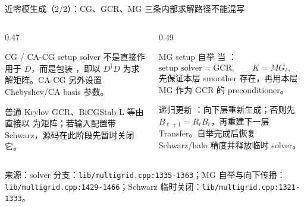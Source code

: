 \documentclass[UTF8,aspectratio=169,11pt]{ctexbeamer}
\newcommand{\source}[1]{\vspace{0.05em}\par{\raggedright\scriptsize\color{muted}来源：#1\par}}
\newcommand{\codepath}[1]{\nolinkurl{#1}}
\begin{document}
\begin{frame}[t]{近零模生成（2/2）：CG、GCR、MG 三条内部求解路径不能混写}
  \begin{columns}[T,totalwidth=\textwidth]
    \begin{column}{0.47\textwidth}
      \begin{block}{CG / CA-CG}
        setup solver 不是直接作用于 \(D\)，而是包装 \texttt{}，即以 \(D^\dagger D\) 为求解矩阵。CA-CG 另外设置 Chebyshev/CA basis 参数。
      \end{block}
      \begin{block}{普通 Krylov}
        GCR、BiCGStab-L 等由 \texttt{} 直接以 \texttt{} 为矩阵；若输入配置带 Schwarz，源码在此阶段先暂时关闭它。
      \end{block}
    \end{column}
    \begin{column}{0.49\textwidth}
      \begin{block}{MG setup 自举}
        当 \texttt{}：
        \[
          \text{setup solver}=\text{GCR},
          \qquad K=MG_\ell,
          \qquad \text{每轮最多一次 MG 预条件调用}.
        \]
        先保证本层 smoother 存在，再用本层 MG 作为 GCR 的 preconditioner。
      \end{block}
      \begin{alertblock}{递归更新}
        \texttt{}：向下层重新生成；否则先 \(B_{\ell+1}=R_\ell B_\ell\)，再重建下一层 Transfer。自举完成后恢复 Schwarz/halo 精度并释放临时 solver。
      \end{alertblock}
    \end{column}
  \end{columns}
  \source{solver 分支：\codepath{lib/multigrid.cpp:1335-1363}；MG 自举与向下传播：\codepath{lib/multigrid.cpp:1429-1466}；Schwarz 临时关闭：\codepath{lib/multigrid.cpp:1321-1333}。}
\end{frame}
\end{document}
